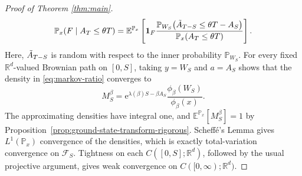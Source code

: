 \documentclass[11pt,reqno]{amsart}
\theoremstyle{definition}
\numberwithin{equation}{section}
\newcommand{\<}{\langle}
\renewcommand{\>}{\rangle}
\def\cF{{\mathcal F}}
\def\prob{{\mathbb P}}
\def\bbE{{\mathbb{E}}}
\def\bbP{{\mathbb{P}}}
\def\cF{{\mathcal{F}}}
\begin{document}
\begin{proof}[Proof of Theorem \ref{thm:main}]
\begin{align}
 \prob_x(F\mid A_T\leq\theta T)
 =
 \bbE^{\bbP_x}\left[
  \mathbf 1_F
  \frac{
   \prob_{W_S}\bigl(\Tilde A_{T-S}\leq\theta T-  A_S\bigr)}
  {\prob_x(A_T\leq\theta T)}
 \right].
 \label{eq:markov-ratio}
\end{align}
Here, $\Tilde A_{T-S}$ is random with respect to the inner probability  $\prob_{W_S}$.
For every fixed $\mathbb R^d$-valued Brownian path on $[0,S]$, taking
$y=W_S$ and $a=A_S$ shows that the density in
\eqref{eq:markov-ratio} converges to
\[
 M_S^\beta
 =\mathrm e^{\lambda(\beta)S-\beta A_S}
  \frac{\phi_\beta(W_S)}{\phi_\beta(x)}.
\]
The approximating densities have integral one, and
$\bbE^{\bbP_x}[M_S^\beta]=1$ by Proposition~\ref{prop:ground-state-transform-rigorous}.  Scheff\'e's Lemma gives
$L^1(\prob_x)$ convergence of the densities, which is exactly total-variation
convergence on $\cF_S$.  Tightness on each $C([0,S];\mathbb R^d)$, followed by the usual
projective argument, gives weak convergence on $C([0,\infty);\mathbb R^d)$.
\end{proof}
\end{document}

